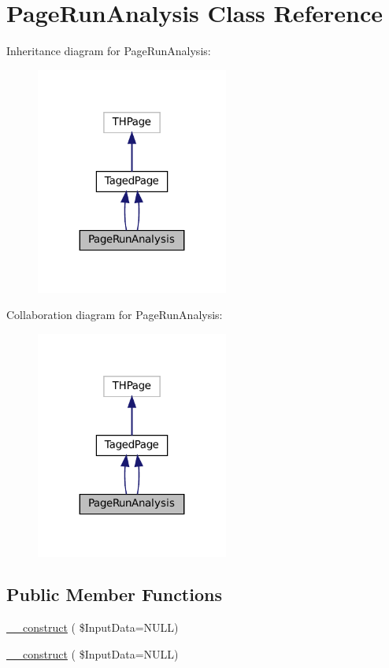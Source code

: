 \hypertarget{class_page_run_analysis}{}\section{Page\+Run\+Analysis Class Reference}
\label{class_page_run_analysis}


Inheritance diagram for Page\+Run\+Analysis\+:\nopagebreak
\begin{figure}[H]
\begin{center}
\leavevmode
\includegraphics[width=179pt]{class_page_run_analysis__inherit__graph}
\end{center}
\end{figure}


Collaboration diagram for Page\+Run\+Analysis\+:\nopagebreak
\begin{figure}[H]
\begin{center}
\leavevmode
\includegraphics[width=179pt]{class_page_run_analysis__coll__graph}
\end{center}
\end{figure}
\subsection*{Public Member Functions}
\begin{DoxyCompactItemize}
\item 
\hyperlink{class_page_run_analysis_a55b883af577385e55cb40c5420e0a692}{\+\_\+\+\_\+construct} ( \$Input\+Data=N\+U\+LL)
\item 
\hyperlink{class_page_run_analysis_a55b883af577385e55cb40c5420e0a692}{\+\_\+\+\_\+construct} ( \$Input\+Data=N\+U\+LL)
\end{DoxyCompactItemize}
